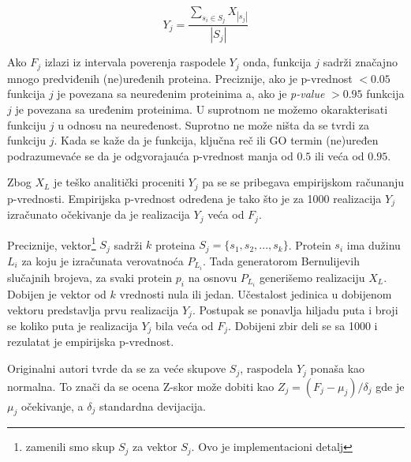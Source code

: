 $$ Y_j = \dfrac {\sum_{s_i \in S_j} {X_{|s_j|}}}{|S_j|}$$

Ako $F_j$ izlazi iz intervala poverenja raspodele $Y_j$ onda, funkcija $j$
sadrži značajno mnogo predviđenih (ne)uređenih proteina. Preciznije,
ako je p-vrednost  $<0.05$ funkcija $j$ je povezana sa neuređenim
proteinima a, ako je \textit{p-value} $>0.95$ funkcija $j$ je povezana sa
uređenim proteinima.
U suprotnom ne možemo okarakterisati funkciju $j$ u odnosu na neuređenost.
Suprotno ne može ništa da se tvrdi za funkciju $j$.  
Kada se kaže da je funkcija, ključna reč ili GO termin (ne)uređen
podrazumevaće se da je odgvorajauća p-vrednost manja od $0.5$ ili veća
od $0.95$.

Zbog $X_L$ je teško analitički proceniti $Y_j$ pa se se pribegava empirijskom
računanju p-vrednosti. Empirijska p-vrednost određena je tako što je za 1000
realizacija $Y_j$ izračunato očekivanje da je realizacija $Y_j$ veća od $F_j$.

Preciznije, vektor\footnote{zamenili smo skup $S_j$ za vektor $S_j$. Ovo je
implementacioni detalj} $S_j$ sadrži $k$ proteina $S_j=\{s_1, s_2, ...
,s_{k}\}$.  Protein $s_i$ ima dužinu $L_i$ za koju je izračunata verovatnoća
$P_{L_i}$.  Tada generatorom Bernulijevih slučajnih brojeva, za svaki protein
$p_i$ na osnovu $P_{L_i}$ generišemo realizaciju $X_L$. Dobijen je vektor od
$k$ vrednosti nula ili jedan. Učestalost jedinica u dobijenom vektoru
predstavlja prvu realizacija $Y_j$.  Postupak se ponavlja hiljadu puta i broji
se koliko puta je realizacija $Y_j$ bila veća od $F_j$. Dobijeni zbir deli se
sa 1000 i rezulatat je empirijska p-vrednost.


Originalni autori tvrde da se za veće skupove $S_j$, raspodela
$Y_j$ ponaša kao normalna. To znači da se ocena Z-skor može dobiti kao
$Z_j=(F_j-\mu_j)/\delta_j$ gde je $\mu_j$ očekivanje, a $\delta_j$ standardna
devijacija. 


